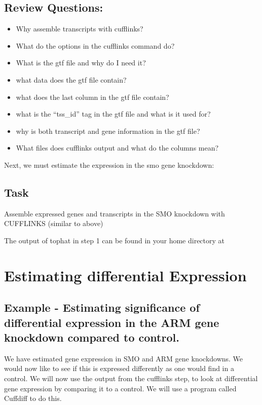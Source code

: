 \documentclass[letterpaper,10pt,english]{sphinxmanual}
\begin{document}
\section{Review Questions:}
\label{STEP4_CUFFLINKS_DE:review-questions}\begin{itemize}
\item {} 
Why assemble transcripts with cufflinks?

\item {} 
What do the options in the cufflinks command do?

\item {} 
What is the gtf file and why do I need it?

\item {} 
what data does the gtf file contain?

\item {} 
what does the last column in the gtf file contain?

\item {} 
what is the ``tss\_id'' tag in the gtf file and what is it used for?

\item {} 
why is both transcript and gene information in the gtf file?

\item {} 
What files does cufflinks output and what do the columns mean?

\end{itemize}

Next, we must estimate the expression in the smo gene knockdown:


\section{Task}
\label{STEP4_CUFFLINKS_DE:task}
Assemble expressed genes and transcripts in the SMO knockdown with CUFFLINKS (similar to above)

The output of tophat in step 1 can be found in your home directory at 


\chapter{Estimating differential Expression}
\label{STEP4_CUFFLINKS_DE:estimating-differential-expression}

\section{Example - Estimating significance of differential expression in the ARM gene knockdown compared to control.}
\label{STEP4_CUFFLINKS_DE:example-estimating-significance-of-differential-expression-in-the-arm-gene-knockdown-compared-to-control}
We have estimated gene expression in SMO and ARM gene knockdowns. We would now like to see if this is expressed differently as one would find in a control. We will now use the output from the cufflinks step, to look at differential gene expression by comparing it to a control. We will use a program called Cuffdiff to do this.
\end{document}
